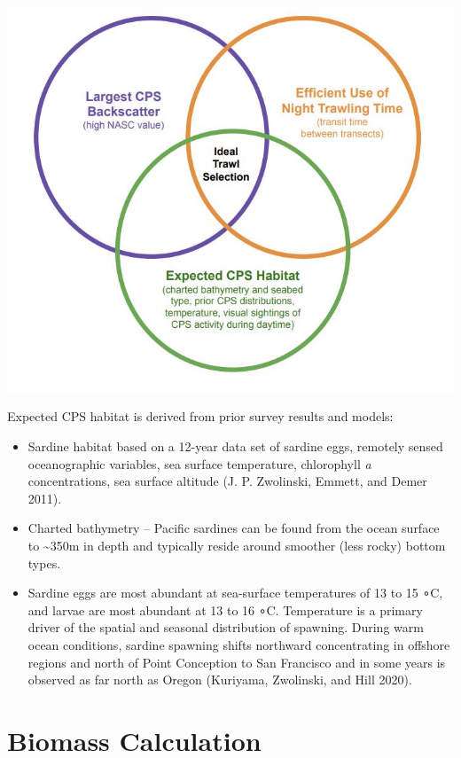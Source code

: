 \documentclass[
  letterpaper,
  oneside,
  open=any]{scrbook}
\begin{document}
\includegraphics[width=6.6875in,height=\textheight]{content/images/trawl-selection.JPG}

Expected CPS habitat is derived from prior survey results and models:

\begin{itemize}
\item
  Sardine habitat based on a 12-year data set of sardine eggs, remotely
  sensed oceanographic variables, sea surface temperature, chlorophyll
  \emph{a} concentrations, sea surface altitude (J. P. Zwolinski,
  Emmett, and Demer 2011).
\item
  Charted bathymetry -- Pacific sardines can be found from the ocean
  surface to \textasciitilde350m in depth and typically reside around
  smoother (less rocky) bottom types.
\item
  Sardine eggs are most abundant at sea-surface temperatures of 13 to 15
  ∘C, and larvae are most abundant at 13 to 16 ∘C. Temperature is a
  primary driver of the spatial and seasonal distribution of spawning.
  During warm ocean conditions, sardine spawning shifts northward
  concentrating in offshore regions and north of Point Conception to San
  Francisco and in some years is observed as far north as Oregon
  (Kuriyama, Zwolinski, and Hill 2020).
\end{itemize}


\chapter{Biomass Calculation}\label{biomass-calculation}
\end{document}
